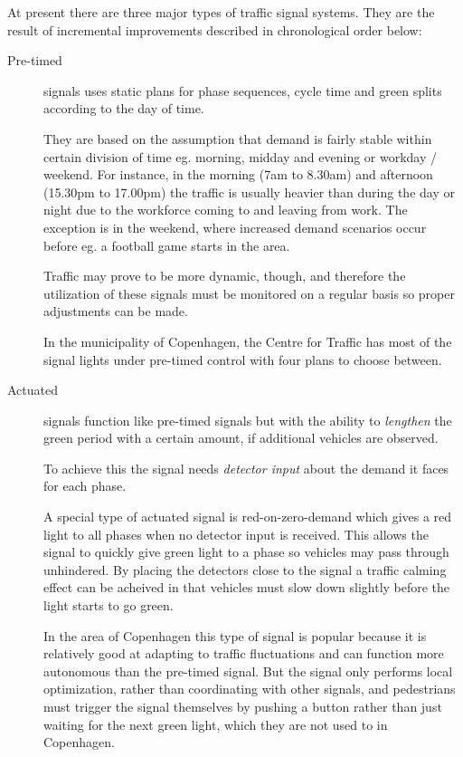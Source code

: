 \label{signal_types}

At present there are three major types of traffic signal systems. They are the result of incremental improvements described in chronological order below:

\begin{description}
\item[Pre-timed] signals uses static plans for phase sequences, cycle time and green splits according to the day of time. 

They are based on the assumption that demand is fairly stable within certain division of time eg. morning, midday and evening or workday / weekend. For instance, in the morning (7am to 8.30am) and afternoon (15.30pm to 17.00pm) the traffic is usually heavier than during the day or night due to the workforce coming to and leaving from work. The exception is in the weekend, where increased demand scenarios occur before eg. a football game starts in the area.

Traffic may prove to be more dynamic, though, and therefore the utilization of these signals must be monitored on a regular basis so proper adjustments can be made.

In the municipality of Copenhagen, the Centre for Traffic has most of the signal lights under pre-timed control with four plans to choose between.
\item[Actuated] signals function like pre-timed signals but with the ability to \textit{lengthen} the green period with a certain amount, if additional vehicles are observed. 

To achieve this the signal needs \textit{detector input} about the demand it faces for each phase.

A special type of actuated signal is red-on-zero-demand which gives a red light to all phases when no detector input is received. This allows the signal to quickly give green light to a phase  so vehicles may pass through unhindered. By placing the detectors close to the signal a traffic calming effect can be acheived in that vehicles must slow down slightly before the light starts to go green.

In the area of Copenhagen this type of signal is popular because it is relatively good at adapting to traffic fluctuations and can function more autonomous than the pre-timed signal. But the signal only performs local optimization, rather than coordinating with other signals, and pedestrians must trigger the signal themselves by pushing a button rather than just waiting for the next green light, which they are not used to in Copenhagen.


\end{description}
